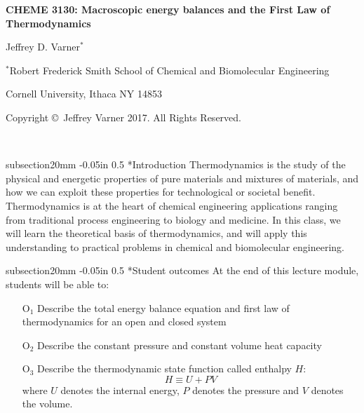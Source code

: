 \documentclass[11pt]{article}
\makeatletter
\theoremstyle{definition}
\renewcommand\subsection{\@startsection
	{subsection}{2}{0mm}
	{-0.05in}
	{0.5\baselineskip}
	{\normalfont\normalsize\bfseries}}
\makeatother
\begin{document}
{\par\centering\textbf{\Large CHEME 3130: Macroscopic energy balances and the First Law of Thermodynamics}}
\vspace{0.2in}
{\par \centering \large{Jeffrey D. Varner$^{*}$}}
\vspace{0.05in}
{\par \centering \large{$^{*}$}Robert Frederick Smith School of Chemical and Biomolecular Engineering}
{\par \centering \large{Cornell University, Ithaca NY 14853}}
\vspace{0.1in}
{\par \centering \small{Copyright \copyright\ Jeffrey Varner 2017. All Rights Reserved.}}\\

\date{}
\thispagestyle{empty}

\setcounter{page}{1}

\begin{mdframed}[backgroundcolor=lgray]

	\subsection*{Introduction}
	Thermodynamics is the study of the physical and energetic properties of pure materials and mixtures of materials, and how we can exploit these properties for technological or societal benefit.
	Thermodynamics is at the heart of chemical engineering applications ranging from traditional process engineering to biology and medicine.
	In this class, we will learn the theoretical basis of thermodynamics, and will apply this understanding to practical problems in chemical and biomolecular engineering.

	\vspace{0.1in}
	\subsection*{Student outcomes}
	At the end of this lecture module, students will be able to:
	\begin{itemize}
	  \item[O$_1$]{Describe the total energy balance equation and first law of thermodynamics for an open and closed system}
	  \item[O$_2$]{Describe the constant pressure and constant volume heat capacity}
		\item[O$_3$]{Describe the thermodynamic state function called enthalpy $H$:
		\begin{equation}
			H \equiv U+PV
		\end{equation}where $U$ denotes the internal energy, $P$ denotes the pressure and $V$ denotes the volume.
		}
	\end{itemize}

\end{mdframed}
\end{document}
